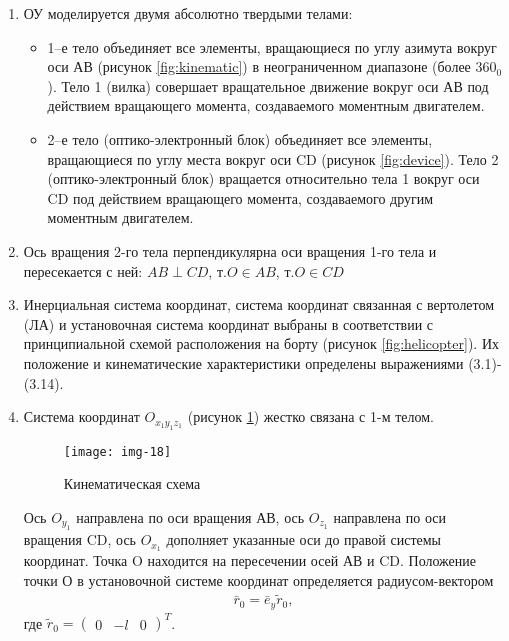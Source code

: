 \begin{enumerate}
	\item ОУ моделируется двумя абсолютно твердыми телами:
	\begin{itemize}
		\item 1–е тело объединяет все элементы, вращающиеся по углу азимута вокруг оси АВ (рисунок \ref{fig:kinematic}) в неограниченном диапазоне (более $360_0$). Тело 1 (вилка) совершает вращательное движение вокруг оси АВ под действием вращающего момента, создаваемого моментным двигателем.
		\item 2–е тело (оптико-электронный блок) объединяет все элементы, вращающиеся по углу места вокруг оси CD (рисунок \ref{fig:device}). Тело 2 (оптико-электронный блок) вращается относительно тела 1 вокруг оси CD под действием вращающего момента, создаваемого другим моментным двигателем.
	\end{itemize}
	\item Ось вращения 2-го тела перпендикулярна оси вращения 1-го тела и пересекается с ней: $AB\perp CD$, т.$O \in AB$, т.$O \in CD$
	\item Инерциальная система координат, система координат связанная с вертолетом (ЛА) и установочная система координат выбраны в соответствии с принципиальной схемой расположения на борту (рисунок \ref{fig:helicopter}). Их положение и кинематические характеристики  определены выражениями (3.1)-(3.14).
	\item Система координат $O_{x_1y_1z_1}$ (рисунок \ref{fig:coord/3.4}) жестко связана с 1-м телом. 
	\begin{figure}[ht]
		\centering
		\texttt{[image: img-18]} 
		\caption{Кинематическая схема}
		\label{fig:coord/3.4}
	\end{figure}

	Ось $O_{y_1}$ направлена по оси вращения АВ, ось $O_{z_1}$ направлена по оси вращения CD, ось $O_{x_1}$ дополняет указанные оси до правой системы координат. Точка O находится на пересечении осей АВ и CD. Положение точки О в установочной системе координат определяется радиусом-вектором
	\begin{equation}
	\label{eq:p3:1}
	\begin{alignedat}{2}
	\bar{r}_0 = \bar{e}_y\tilde{r}_0 ,
	\end{alignedat}
	\end{equation}
	где $\tilde{r}_0 = \left( \begin{matrix}	0  &  -l  &  0 \end{matrix} \right)^T$.
	

\end{enumerate}
